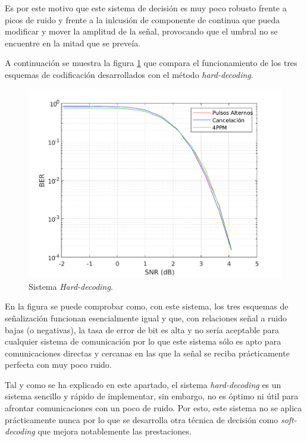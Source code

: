 Es por este motivo que este sistema de decisión es muy poco robusto frente a picos de 
ruido y frente a la inlcusión de componente de continua que pueda modificar y mover 
la amplitud de la señal, provocando que el umbral no se encuentre en la mitad que 
se preveía.

A continuación se muestra la figura \ref{hard-decoding} que compara el funcionamiento de 
los tres esquemas de codificación desarrollados con el método \textit{hard-decoding}.

\begin{figure}[ht]
    \centering
    \includegraphics[scale=0.65]{./figuras/Hard.pdf}
    \caption{\small{Sistema \textit{Hard-decoding}.}}
    \label{hard-decoding}%
\end{figure}

En la figura se puede comprobar como, con este sistema, los tres esquemas de señalización 
funcionan esencialmente igual y que, con relaciones señal a ruido bajas (o negativas), la 
tasa de error de bit es alta y no sería aceptable para cualquier sistema de comunicación
por lo que este sistema sólo es apto para comunicaciones directas y cercanas en las que 
la señal se reciba prácticamente perfecta con muy poco ruido.

Tal y como se ha explicado en este apartado, el sistema \textit{hard-decoding} es 
un sistema sencillo y rápido de implementar, sin embargo, no es 
óptimo ni útil para afrontar comunicaciones con un poco de ruido. Por esto, este sistema
no se aplica prácticamente nunca por lo que 
se desarrolla otra técnica de decisión como \textit{soft-decoding} que mejora notablemente
las prestaciones.

